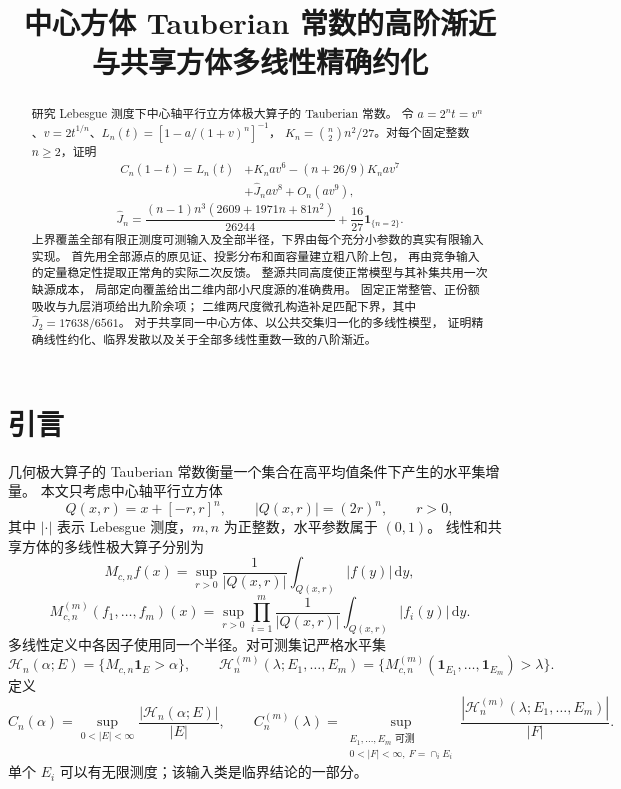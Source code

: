 \documentclass[UTF8,11pt,fontset=none]{ctexart}
\title{中心方体 Tauberian 常数的高阶渐近\texorpdfstring{\\}{ }与共享方体多线性精确约化}
\author{}
\date{}
\theoremstyle{remark}
\newcommand{\ind}{\mathbf 1}
\newcommand{\dd}{\,\mathrm d}
\newcommand{\Hc}{\mathcal H_n}
\newcommand{\Hm}{\mathcal H_n^{(m)}}
\newcommand{\Mc}{M_{c,n}}
\newcommand{\Mm}{M_{c,n}^{(m)}}
\newcommand{\Cn}{C_n}
\newcommand{\Cm}{C_n^{(m)}}
\begin{document}
\maketitle
\begin{abstract}
研究 Lebesgue 测度下中心轴平行立方体极大算子的 Tauberian 常数。
令 \(a=2^nt=v^n\)、\(v=2t^{1/n}\)、\(L_n(t)=[1-a/(1+v)^n]^{-1}\)，
\(K_n=\binom{n}{2}n^2/27\)。对每个固定整数 \(n\ge2\)，证明
\[
 \begin{aligned}
 C_n(1-t)=L_n(t)&+K_nav^6-(n+26/9)K_nav^7\\
 &+\widehat J_nav^8+O_n(av^9),
 \end{aligned}
\]
\[
 \widehat J_n=\frac{(n-1)n^3(2609+1971n+81n^2)}{26244}
                  +\frac{16}{27}\ind_{\{n=2\}}.
\]
上界覆盖全部有限正测度可测输入及全部半径，下界由每个充分小参数的真实有限输入实现。
首先用全部源点的原见证、投影分布和面容量建立粗八阶上包，
再由竞争输入的定量稳定性提取正常角的实际二次反馈。
整源共同高度使正常模型与其补集共用一次缺源成本，
局部定向覆盖给出二维内部小尺度源的准确费用。
固定正常整管、正份额吸收与九层消项给出九阶余项；
二维两尺度微孔构造补足匹配下界，其中 \(\widehat J_2=17638/6561\)。
对于共享同一中心方体、以公共交集归一化的多线性模型，
证明精确线性约化、临界发散以及关于全部多线性重数一致的八阶渐近。
\end{abstract}
\section{引言}

几何极大算子的 Tauberian 常数衡量一个集合在高平均值条件下产生的水平集增量。
本文只考虑中心轴平行立方体
\[
 Q(x,r)=x+[-r,r]^n,\qquad |Q(x,r)|=(2r)^n,\qquad r>0,
\]
其中 \(|\cdot|\) 表示 Lebesgue 测度，\(m,n\) 为正整数，水平参数属于 \((0,1)\)。
线性和共享方体的多线性极大算子分别为
\[
 \Mc f(x)=\sup_{r>0}\frac1{|Q(x,r)|}\int_{Q(x,r)}|f(y)|\dd y,
\]
\[
 \Mm(f_1,\ldots,f_m)(x)
 =\sup_{r>0}\prod_{i=1}^m
 \frac1{|Q(x,r)|}\int_{Q(x,r)}|f_i(y)|\dd y.
\]
多线性定义中各因子使用同一个半径。对可测集记严格水平集
\[
 \Hc(\alpha;E)=\{\Mc\ind_E>\alpha\},\qquad
 \Hm(\lambda;E_1,\ldots,E_m)
 =\{\Mm(\ind_{E_1},\ldots,\ind_{E_m})>\lambda\}.
\]
定义
\begin{equation}\label{eq:constants}
 \Cn(\alpha)=\sup_{0<|E|<\infty}\frac{|\Hc(\alpha;E)|}{|E|},
 \qquad
 \Cm(\lambda)=
 \sup_{\substack{E_1,\ldots,E_m\text{ 可测}\\
                  0<|F|<\infty,\ F=\cap_iE_i}}
 \frac{|\Hm(\lambda;E_1,\ldots,E_m)|}{|F|}.
\end{equation}
单个 \(E_i\) 可以有无限测度；该输入类是临界结论的一部分。
\end{document}
